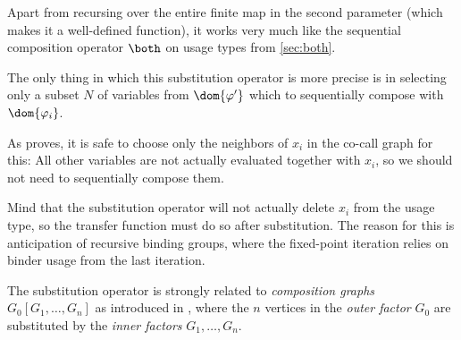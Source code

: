 Apart from recursing over the entire finite map in the second parameter (which makes it a well-defined function), it works very much like the sequential composition operator $\both$ on usage types from \cref{sec:both}.

The only thing in which this substitution operator is more precise is in selecting only a subset $N$ of variables from $\dom{\varphi'}$ which to sequentially compose with $\dom{\varphi_i}$.

As \textcite{callarity} proves, it is safe to choose only the neighbors of $x_i$ in the co-call graph for this:
All other variables are not actually evaluated together with $x_i$, so we should not need to sequentially compose them.

Mind that the substitution operator will not actually delete $x_i$ from the usage type, so the transfer function must do so after substitution.
The reason for this is anticipation of recursive binding groups, where the fixed-point iteration relies on binder usage from the last iteration.

The substitution operator is strongly related to \emph{composition graphs} $G_0[G_1,\ldots,G_n]$ as introduced in \textcite[pp.~109]{agt}, where the $n$ vertices in the \emph{outer factor} $G_0$ are substituted by the \emph{inner factors} $G_1,\ldots,G_n$. 

